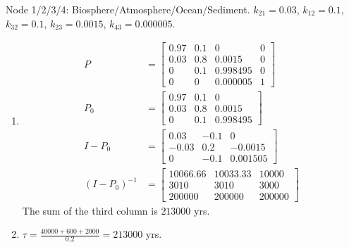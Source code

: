 \begin{Answer}
Node 1/2/3/4: Biosphere/Atmosphere/Ocean/Sediment. $k_{21} = 0.03$, $k_{12} = 0.1$,
$k_{32} = 0.1$, $k_{23} = 0.0015$, $k_{43} = 0.000005$.
\begin{enumerate}[label=(\alph*)]
\item
\begin{align*}
P &= 
\begin{bmatrix}
0.97 & 0.1 & 0 & 0\\
0.03 & 0.8 & 0.0015 & 0\\
0 & 0.1 & 0.998495 & 0\\
0 & 0 & 0.000005 & 1
\end{bmatrix} \\
P_0 &= 
\begin{bmatrix}
0.97 & 0.1 & 0\\
0.03 & 0.8 & 0.0015\\
0 & 0.1 & 0.998495
\end{bmatrix} \\
I-P_0 &=
\begin{bmatrix}
0.03 & -0.1 & 0\\
-0.03 & 0.2 & -0.0015\\
0 & -0.1 & 0.001505
\end{bmatrix} \\
(I-P_0)^{-1} &=
\begin{bmatrix}
10066.66 & 10033.33 & 10000\\
3010 & 3010 & 3000\\
200000 & 200000 & 200000
\end{bmatrix} 
\end{align*}
The sum of the third column is $213000$ yrs.
\item $\tau = \frac{40000+600+2000}{0.2} = 213000$ yrs.
\end{enumerate}
\end{Answer}

